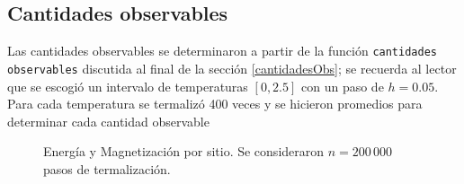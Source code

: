 \documentclass[11pt,a4paper]{article}
\begin{document}
\subsection{Cantidades observables}

Las cantidades observables se determinaron a partir de la función \texttt{cantidades observables} discutida al final de la sección \ref{cantidadesObs}; se recuerda al lector que se escogió un intervalo de temperaturas $[0,2.5]$ con un paso de $h=0.05$. Para cada temperatura se termalizó 400 veces y se hicieron promedios para determinar cada cantidad observable
\begin{figure}[h!]
\centering
{}
\caption{Energía y Magnetización por sitio. Se consideraron $n=200\, 000$ pasos de termalización. }
\label{fig:eSymS}
\end{figure}
\end{document}
